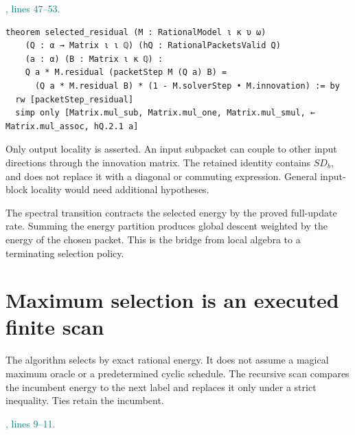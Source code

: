 \documentclass[11pt]{article}\usepackage{needspace}\renewcommand{\paperkind}{Lean companion}\setlength{\parskip}{0.35em}
\begin{document}

{\small\textcolor{teal}{, lines 47--53.}\par}

\begin{lstlisting}[style=BayesSource]
theorem selected_residual (M : RationalModel ι κ υ ω)
    (Q : α → Matrix ι ι ℚ) (hQ : RationalPacketsValid Q)
    (a : α) (B : Matrix ι κ ℚ) :
    Q a * M.residual (packetStep M (Q a) B) =
      (Q a * M.residual B) * (1 - M.solverStep • M.innovation) := by
  rw [packetStep_residual]
  simp only [Matrix.mul_sub, Matrix.mul_one, Matrix.mul_smul, ← Matrix.mul_assoc, hQ.2.1 a]
\end{lstlisting}

Only output locality is asserted. An input subpacket can couple to other input directions through the innovation matrix. The retained  identity contains $SD_b$, and does not replace it with a diagonal or commuting expression. General input-block locality would need additional hypotheses.

The spectral transition contracts the selected energy by the proved full-update rate. Summing the energy partition produces global descent weighted by the energy of the chosen packet. This is the bridge from local algebra to a terminating selection policy.

\section{Maximum selection is an executed finite scan}

The algorithm selects by exact rational energy. It does not assume a magical maximum oracle or a predetermined cyclic schedule. The recursive scan compares the incumbent energy to the next label and replaces it only under a strict inequality. Ties retain the incumbent.



{\small\textcolor{teal}{, lines 9--11.}\par}
\end{document}
